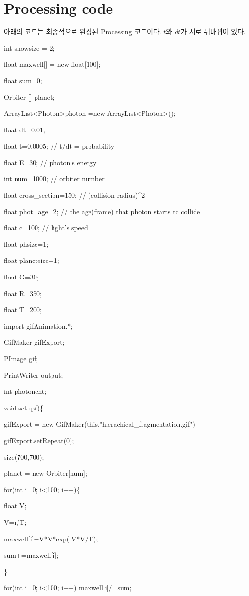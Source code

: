 \documentclass{gshs-hutech}
\begin{document}
\section{Processing code}
아래의 코드는 최종적으로 완성된 Processing 코드이다. $t$와 $dt$가 서로 뒤바뀌어 있다.
\begin{tiny}

int showsize = 2;

float maxwell[] = new float[100];

float sum=0;

Orbiter [] planet;

ArrayList\textless Photon\textgreater photon =new ArrayList\textless Photon\textgreater();

float dt=0.01;

float t=0.0005;  //  t/dt = probability

float E=30;    // photon's energy

int num=1000;   // orbiter number

float cross\_section=150;  //  (collision radius)\textasciicircum2

float phot\_age=2;  //  the age(frame) that photon starts to collide

float c=100; //  light's speed

float phsize=1;

float planetsize=1;

float G=30;

float R=350;

float T=200;

import gifAnimation.*;

GifMaker gifExport;

PImage gif;

PrintWriter output;

int photoncnt;

void setup()\{

gifExport = new GifMaker(this,"hierachical\_fragmentation.gif");

gifExport.setRepeat(0);

size(700,700);

planet = new Orbiter[num];

for(int i=0; i\textless100; i++)\{

float V;

V=i/T;

maxwell[i]=V*V*exp(-V*V/T);

sum+=maxwell[i];

\}

for(int i=0; i\textless100; i++) maxwell[i]/=sum;


\end{tiny}
\end{document}
